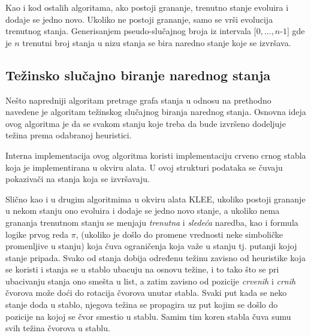 \documentclass[12pt,oneside]{memoir}
\begin{document}
Kao i kod ostalih algoritama, ako postoji grananje, trenutno stanje evoluira i dodaje se jedno novo. Ukoliko ne postoji grananje, samo se vrši evolucija trenutnog stanja. Generisanjem pseudo-slučajnog broja iz intervala $[0, ..., n $-$ 1]$ gde je $n$ trenutni broj stanja u nizu stanja se bira naredno stanje koje se izvršava.

\subsection{Težinsko slučajno biranje narednog stanja} 
Nešto napredniji algoritam pretrage grafa stanja u odnosu na prethodno navedene je algoritam težinskog slučajnog biranja narednog stanja. Osnovna ideja ovog algoritma je da se svakom stanju koje treba da bude izvršeno dodeljuje težina prema odabranoj heuristici. 

Interna implementacija ovog algoritma koristi implementaciju crveno crnog stabla koja je implementirana u okviru alata. U ovoj strukturi podataka se čuvaju pokazivači na stanja koja se izvršavaju. 

Slično kao i u drugim algoritmima u okviru alata KLEE, ukoliko postoji grananje u nekom stanju ono evoluira i dodaje se jedno novo stanje, a ukoliko nema grananja trenutnom stanju se menjaju \textit{trenutna} i \textit{sledeća} naredba, kao i formula logike prvog reda $\pi$, (ukoliko je došlo do promene vrednosti neke simboličke promenljive u stanju) koja čuva ograničenja koja važe u stanju tj. putanji kojoj stanje pripada. Svako od stanja dobija određenu težinu zavisno od heuristike koja se koristi i stanja se u stablo ubacuju na osnovu težine, i to tako što se pri ubacivanju stanja ono smešta u list, a zatim zavisno od pozicije \textit{crvenih} i \textit{crnih} čvorova može doći do rotacija čvorova unutar stabla. Svaki put kada se neko stanje doda u stablo, njegova težina se propagira uz put kojim se došlo do pozicije na kojoj se čvor smestio u stablu. Samim tim koren stabla čuva sumu svih težina čvorova u stablu. 
\end{document}
